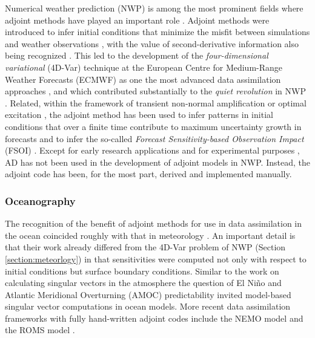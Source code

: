 Numerical weather prediction (NWP) is among the most prominent fields where adjoint methods have played an important role \cite{Errico_1997}. 
Adjoint methods were introduced to infer initial conditions that minimize the misfit between simulations and weather observations \cite{Lewis.1985,Talagrand.1987,Courtier.1987}, with the value of second-derivative information also being recognized \cite{Dimet.2002}. 
This led to the development of the \textit{four-dimensional variational} (4D-Var) technique at the European Centre for Medium-Range Weather Forecasts (ECMWF) as one the most advanced data assimilation approaches \cite{Rabier.1992,Rabier:2000uu}, and which contributed substantially to the \textit{quiet revolution} in NWP \cite{Bauer.2015}.
Related, within the framework of transient non-normal amplification or optimal excitation \cite{Farrell.1988,Farrell:1996jx}, the adjoint method has been used to infer patterns in initial conditions that over a finite time contribute to maximum uncertainty growth in forecasts \cite{Palmer:1994br,Buizza:1995in} and to infer the so-called \textit{Forecast Sensitivity-based Observation Impact} (FSOI) \cite{Langland:2004jo}.
Except for early research applications \cite{Park.1996,Park.2000} and for experimental purposes \cite{Giering.2006}, AD has not been used in the development of adjoint models in NWP.
Instead, the adjoint code has been, for the most part, derived and implemented manually.

\subsubsection{Oceanography}

The recognition of the benefit of adjoint methods for use in data assimilation in the ocean coincided roughly with that in meteorology \cite{Thacker:1988kp,Thacker:1988ed,Thacker:1989jf,Tziperman.1989,Tziperman:1992hg,Tziperman:1992jw}. 
An important detail is that their work already differed from the 4D-Var problem of NWP (Section \ref{section:meteorlogy}) in that sensitivities were computed not only with respect to initial conditions but surface boundary conditions.
Similar to the work on calculating singular vectors in the atmosphere 
the question of El Ni\~no \cite{Moore.1997ah,Moore.1997}
and Atlantic Meridional Overturning (AMOC) \cite{Zanna.2010,Zanna:2011ge,Zanna:2012dw}
predictability invited model-based singular vector computations in ocean models. 
More recent data assimilation frameworks with fully hand-written adjoint codes include the NEMO model \cite{Weaver.2003,Vidard:2015kj} and the ROMS model \cite{Moore:2004fk,Moore:2011bc}.

